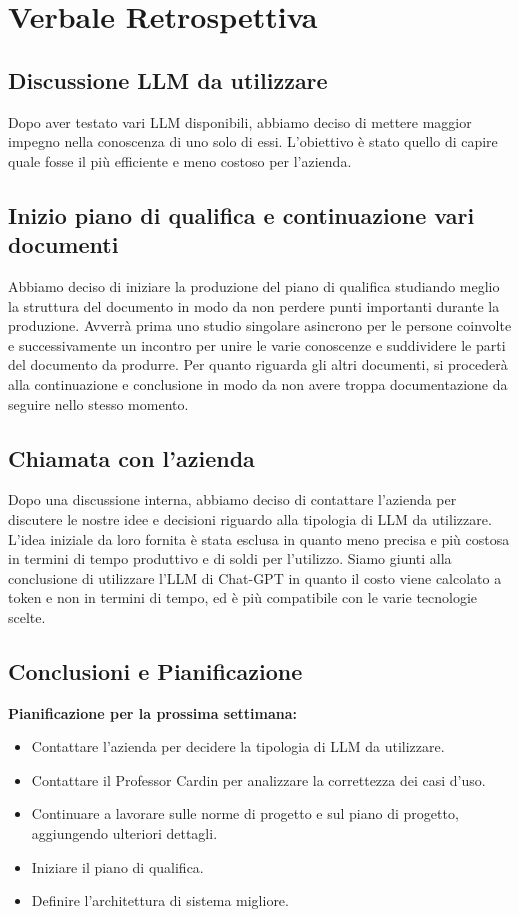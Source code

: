 \documentclass{article}
\begin{document}
\newpage
\section{Verbale Retrospettiva}

    \subsection{Discussione LLM da utilizzare}
    Dopo aver testato vari LLM disponibili, abbiamo deciso di mettere maggior impegno nella conoscenza di uno solo di essi. L'obiettivo è stato quello di capire quale fosse il più efficiente e meno costoso per l'azienda.

    \subsection{Inizio piano di qualifica e continuazione vari documenti}
    Abbiamo deciso di iniziare la produzione del piano di qualifica studiando meglio la struttura del documento in modo da non perdere punti importanti durante la produzione. Avverrà prima uno studio singolare asincrono per le persone coinvolte e successivamente un incontro per unire le varie conoscenze e suddividere le parti del documento da produrre. Per quanto riguarda gli altri documenti, si procederà alla continuazione e conclusione in modo da non avere troppa documentazione da seguire nello stesso momento.

    \subsection{Chiamata con l'azienda}
    Dopo una discussione interna, abbiamo deciso di contattare l'azienda per discutere le nostre idee e decisioni riguardo alla tipologia di LLM da utilizzare. L'idea iniziale da loro fornita è stata esclusa in quanto meno precisa e più costosa in termini di tempo produttivo e di soldi per l'utilizzo. Siamo giunti alla conclusione di utilizzare l'LLM di Chat-GPT in quanto il costo viene calcolato a token e non in termini di tempo, ed è più compatibile con le varie tecnologie scelte.
    

    \subsection{Conclusioni e Pianificazione} 
    \textbf{Pianificazione per la prossima settimana:} 
    \begin{itemize}
        \item Contattare l'azienda per decidere la tipologia di LLM da utilizzare.
        \item Contattare il Professor Cardin per analizzare la correttezza dei casi d'uso.
        \item Continuare a lavorare sulle norme di progetto e sul piano di progetto, aggiungendo ulteriori dettagli.
        \item Iniziare il piano di qualifica.
        \item Definire l'architettura di sistema migliore.
    \end{itemize}
\end{document}
